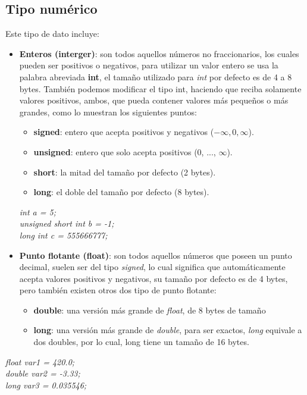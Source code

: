 \subsection{Tipo numérico}
\hspace{0.55cm}Este tipo de dato incluye:
\begin{itemize}
    \item \textbf{Enteros (interger)}: son todos aquellos números no fraccionarios, los cuales pueden ser positivos o negativos, para utilizar un valor entero se usa la palabra abreviada \textbf{int}, el tamaño utilizado para \textit{int} por defecto es de 4 a 8 bytes. También podemos modificar el tipo int, haciendo que reciba solamente valores positivos, ambos, que pueda contener valores más pequeños o más grandes, como lo muestran los siguientes puntos:
    \begin{itemize}
        \item \textbf{signed}: entero que acepta positivos y negativos ($-\infty, 0, \infty$).
        \item \textbf{unsigned}: entero que solo acepta positivos (0, ..., $\infty$).
        \item \textbf{short}: la mitad del tamaño por defecto (2 bytes).
        \item \textbf{long}: el doble del tamaño por defecto (8 bytes).
    \end{itemize}
    \begin{center}
        \textit{int a = 5;} \\
        \textit{unsigned short int b = -1;} \\
        \textit{long int c = 555666777;}
    \end{center}
    \item \textbf{Punto flotante (float)}: son todos aquellos números que poseen un punto decimal, suelen ser del tipo \textit{signed}, lo cual significa que automáticamente acepta valores positivos y negativos, su tamaño por defecto es de 4 bytes, pero también existen otros dos tipo de punto flotante:
    \begin{itemize}
        \item \textbf{double}: una versión más grande de \textit{float}, de 8 bytes de tamaño
        \item \textbf{long}: una versión más grande de \textit{double}, para ser exactos, \textit{long} equivale a dos doubles, por lo cual, long tiene un tamaño de 16 bytes.
    \end{itemize}
\end{itemize}
\begin{center}
    \textit{
        float var1 = 420.0; \\
        double var2 = -3.33; \\
        long var3 = 0.035546;
    }
\end{center}


